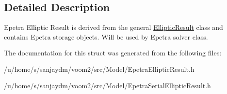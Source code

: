 \subsection{Detailed Description}
Epetra Elliptic Result is derived from the general \hyperlink{structvoom_1_1_elliptic_result}{EllipticResult} class and contains Epetra storage objects. Will be used by Epetra solver class. 

The documentation for this struct was generated from the following files:\begin{DoxyCompactItemize}
\item 
/u/home/s/sanjaydm/voom2/src/Model/EpetraEllipticResult.h\item 
/u/home/s/sanjaydm/voom2/src/Model/EpetraSerialEllipticResult.h\end{DoxyCompactItemize}

